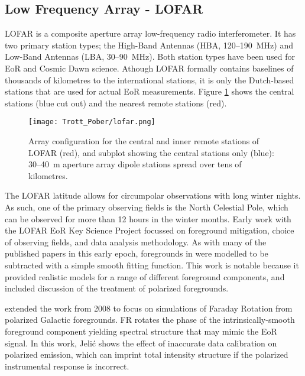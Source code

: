 \subsection{Low Frequency Array  - LOFAR}
LOFAR is a composite aperture array low-frequency radio interferometer. It has two primary station types; the High-Band Antennas (HBA, 120--190~MHz) and Low-Band Antennas (LBA, 30--90~MHz). Both station types have been used for EoR and Cosmic Dawn science. Athough LOFAR formally contains baselines of thousands of kilometres to the international stations, it is only the Dutch-based stations that are used for actual EoR measurements. Figure \ref{fig:lofar} shows the central stations (blue cut out) and the nearest remote stations (red).
\begin{figure}[ht]
\centering
\texttt{[image: Trott\_Pober/lofar.png]}
\caption{Array configuration for the central and inner remote stations of LOFAR (red), and subplot showing the central stations only (blue): 30--40~m aperture array dipole stations spread over tens of kilometres.}\label{fig:lofar}
\end{figure}

The LOFAR latitude allows for circumpolar observations with long winter nights. As such, one of the primary observing fields is the North Celestial Pole, which can be observed for more than 12 hours in the winter months.
Early work with the LOFAR EoR Key Science Project focussed on foreground mitigation, choice of observing fields, and data analysis methodology. As with many of the published papers in this early epoch, foregrounds in \cite{2008MNRAS.389.1319J} were modelled to be subtracted with a simple smooth fitting function. This work is notable because it provided realistic models for a range of different foreground components, and included discussion of the treatment of polarized foregrounds.

\cite{2010MNRAS.409.1647J} extended the work from 2008 to focus on simulations of Faraday Rotation from polarized Galactic foregrounds. FR rotates the phase of the intrinsically-smooth foreground component yielding spectral structure that may mimic the EoR signal. In this work, Jeli{\'c} shows the effect of inaccurate data calibration on polarized emission, which can imprint total intensity structure if the polarized instrumental response is incorrect.


